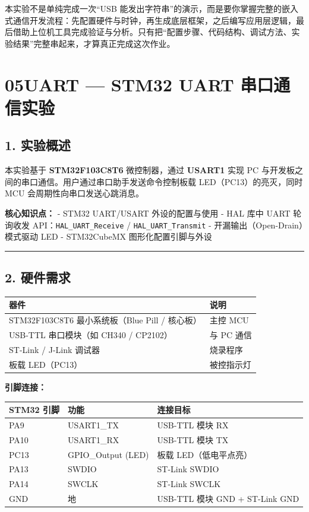 \documentclass[
  chinese,
  UTF8,
  oneside,
  openany]{ctexbook}
\begin{document}
本实验不是单纯完成一次``USB
能发出字符串''的演示，而是要你掌握完整的嵌入式通信开发流程：先配置硬件与时钟，再生成底层框架，之后编写应用层逻辑，最后借助上位机工具完成验证与分析。只有把``配置步骤、代码结构、调试方法、实验结果''完整串起来，才算真正完成这次作业。

\chapter{05UART --- STM32 UART
串口通信实验}\label{uart-stm32-uart-ux4e32ux53e3ux901aux4fe1ux5b9eux9a8c}

\section{1. 实验概述}\label{ux5b9eux9a8cux6982ux8ff0}

本实验基于 \textbf{STM32F103C8T6} 微控制器，通过 \textbf{USART1} 实现 PC
与开发板之间的串口通信。用户通过串口助手发送命令控制板载
LED（PC13）的亮灭，同时 MCU 会周期性向串口发送心跳消息。

\textbf{核心知识点：} - STM32 UART/USART 外设的配置与使用 - HAL 库中
UART 轮询收发 API：\texttt{HAL\_UART\_Receive} /
\texttt{HAL\_UART\_Transmit} - 开漏输出（Open-Drain）模式驱动 LED -
STM32CubeMX 图形化配置引脚与外设

\begin{center}\rule{0.5\linewidth}{0.5pt}\end{center}

\section{2. 硬件需求}\label{ux786cux4ef6ux9700ux6c42}

\begin{longtable}[]{@{}ll@{}}
\toprule\noalign{}
器件 & 说明 \\
\midrule\noalign{}
\endhead
\bottomrule\noalign{}
\endlastfoot
STM32F103C8T6 最小系统板（Blue Pill / 核心板） & 主控 MCU \\
USB-TTL 串口模块（如 CH340 / CP2102） & 与 PC 通信 \\
ST-Link / J-Link 调试器 & 烧录程序 \\
板载 LED（PC13） & 被控指示灯 \\
\end{longtable}

\textbf{引脚连接：}

\begin{longtable}[]{@{}lll@{}}
\toprule\noalign{}
STM32 引脚 & 功能 & 连接目标 \\
\midrule\noalign{}
\endhead
\bottomrule\noalign{}
\endlastfoot
PA9 & USART1\_TX & USB-TTL 模块 RX \\
PA10 & USART1\_RX & USB-TTL 模块 TX \\
PC13 & GPIO\_Output (LED) & 板载 LED（低电平点亮） \\
PA13 & SWDIO & ST-Link SWDIO \\
PA14 & SWCLK & ST-Link SWCLK \\
GND & 地 & USB-TTL 模块 GND + ST-Link GND \\
\end{longtable}
\end{document}
